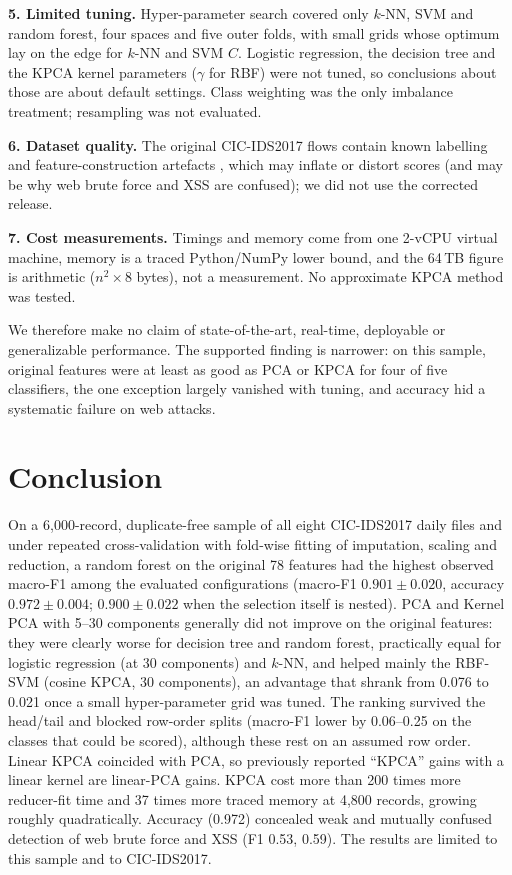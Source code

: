 \documentclass[conference]{IEEEtran}
\begin{document}
\textbf{5. Limited tuning.} Hyper-parameter search covered only $k$-NN, SVM and random forest, four spaces and five outer folds, with small grids whose optimum lay on the edge for $k$-NN and SVM $C$. Logistic regression, the decision tree and the KPCA kernel parameters ($\gamma$ for RBF) were not tuned, so conclusions about those are about default settings. Class weighting was the only imbalance treatment; resampling was not evaluated.

\textbf{6. Dataset quality.} The original CIC-IDS2017 flows contain known labelling and feature-construction artefacts \cite{engelen2021}, which may inflate or distort scores (and may be why web brute force and XSS are confused); we did not use the corrected release.

\textbf{7. Cost measurements.} Timings and memory come from one 2-vCPU virtual machine, memory is a traced Python/NumPy lower bound, and the 64\,TB figure is arithmetic ($n^2\times8$ bytes), not a measurement. No approximate KPCA method was tested.

We therefore make no claim of state-of-the-art, real-time, deployable or generalizable performance. The supported finding is narrower: on this sample, original features were at least as good as PCA or KPCA for four of five classifiers, the one exception largely vanished with tuning, and accuracy hid a systematic failure on web attacks.

\section{Conclusion}
On a 6{,}000-record, duplicate-free sample of all eight CIC-IDS2017 daily files and under repeated cross-validation with fold-wise fitting of imputation, scaling and reduction, a random forest on the original 78 features had the highest observed macro-F1 among the evaluated configurations (macro-F1 $0.901\pm0.020$, accuracy $0.972\pm0.004$; $0.900\pm0.022$ when the selection itself is nested). PCA and Kernel PCA with 5--30 components generally did not improve on the original features: they were clearly worse for decision tree and random forest, practically equal for logistic regression (at 30 components) and $k$-NN, and helped mainly the RBF-SVM (cosine KPCA, 30 components), an advantage that shrank from 0.076 to 0.021 once a small hyper-parameter grid was tuned. The ranking survived the head/tail and blocked row-order splits (macro-F1 lower by 0.06--0.25 on the classes that could be scored), although these rest on an assumed row order. Linear KPCA coincided with PCA, so previously reported ``KPCA'' gains with a linear kernel are linear-PCA gains. KPCA cost more than 200 times more reducer-fit time and 37 times more traced memory at 4{,}800 records, growing roughly quadratically. Accuracy (0.972) concealed weak and mutually confused detection of web brute force and XSS (F1 0.53, 0.59). The results are limited to this sample and to CIC-IDS2017.
\end{document}
